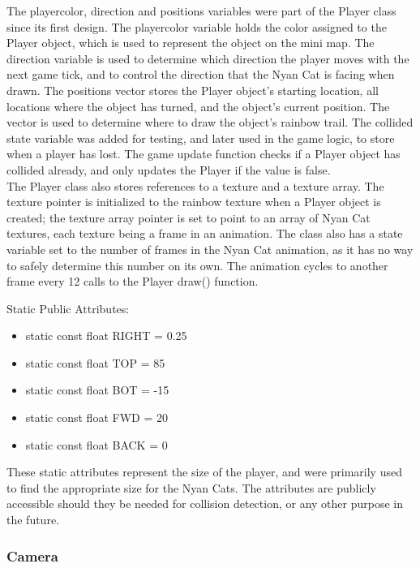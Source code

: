 \documentclass[12pt]{article}
\begin{document}
The playercolor, direction and positions variables were part of the Player class since its first design.  The playercolor variable holds the color assigned to the Player object, which is used to represent the object on the mini map.  The direction variable is used to determine which direction the player moves with the next game tick, and to control the direction that the Nyan Cat is facing when drawn.  The positions vector stores the Player object's starting location, all locations where the object has turned, and the object's current position.  The vector is used to determine where to draw the object's rainbow trail.  The collided state variable was added for testing, and later used in the game logic, to store when a player has lost.  The game update function checks if a Player object has collided already, and only updates the Player if the value is false.  \\

The Player class also stores references to a texture and a texture array.  The texture pointer is initialized to the rainbow texture when a Player object is created; the texture array pointer is set to point to an array of Nyan Cat textures, each texture being a frame in an animation.  The class also has a state variable set to the number of frames in the Nyan Cat animation, as it has no way to safely determine this number on its own.  The animation cycles to another frame every 12 calls to the Player draw() function.

\vspace{5 mm}
\indent Static Public Attributes:

\begin{itemize}
\item static const float RIGHT = 0.25
\item static const float TOP = 85
\item static const float BOT = -15
\item static const float FWD = 20
\item static const float BACK = 0
\end{itemize}

These static attributes represent the size of the player, and were primarily used to find the appropriate size for the Nyan Cats.  The attributes are publicly accessible should they be needed for collision detection, or any other purpose in the future.

\subsubsection{Camera}
\end{document}
